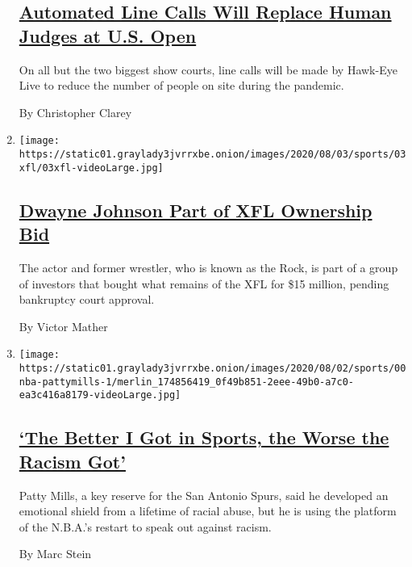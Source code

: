 \begin{enumerate}
{  \subsection{\texorpdfstring{\href{/2020/08/03/sports/tennis/us-open-hawkeye-line-judges.html}{Automated
  Line Calls Will Replace Human Judges at U.S.
  Open}}{Automated Line Calls Will Replace Human Judges at U.S. Open}}\label{automated-line-calls-will-replace-human-judges-at-us-open}}

  On all but the two biggest show courts, line calls will be made by
  Hawk-Eye Live to reduce the number of people on site during the
  pandemic.

  By Christopher Clarey
\item
  \texttt{[image: https://static01.graylady3jvrrxbe.onion/images/2020/08/03/sports/03xfl/03xfl-videoLarge.jpg]}

  \hypertarget{dwayne-johnson-part-of-xfl-ownership-bid}{%
  \subsection{\texorpdfstring{\href{/2020/08/03/sports/football/xfl-the-rock-dwayne-johnson.html}{Dwayne
  Johnson Part of XFL Ownership
  Bid}}{Dwayne Johnson Part of XFL Ownership Bid}}\label{dwayne-johnson-part-of-xfl-ownership-bid}}

  The actor and former wrestler, who is known as the Rock, is part of a
  group of investors that bought what remains of the XFL for \$15
  million, pending bankruptcy court approval.

  By Victor Mather
\item
  \texttt{[image: https://static01.graylady3jvrrxbe.onion/images/2020/08/02/sports/00nba-pattymills-1/merlin\_174856419\_0f49b851-2eee-49b0-a7c0-ea3c416a8179-videoLarge.jpg]}

  \hypertarget{the-better-i-got-in-sports-the-worse-the-racism-got}{%
  \subsection{\texorpdfstring{\href{/2020/07/31/sports/basketball/spurs-patty-mills.html}{`The
  Better I Got in Sports, the Worse the Racism
  Got'}}{`The Better I Got in Sports, the Worse the Racism Got'}}\label{the-better-i-got-in-sports-the-worse-the-racism-got}}

  Patty Mills, a key reserve for the San Antonio Spurs, said he
  developed an emotional shield from a lifetime of racial abuse, but he
  is using the platform of the N.B.A.'s restart to speak out against
  racism.

  By Marc Stein
\end{enumerate}

